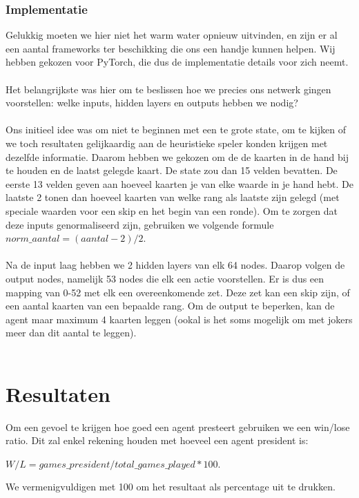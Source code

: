 \documentclass[11pt]{article}
\begin{document}
\subsubsection{Implementatie}
Gelukkig moeten we hier niet het warm water opnieuw uitvinden, en zijn er al een aantal frameworks ter beschikking die ons een handje kunnen helpen. Wij hebben gekozen voor PyTorch, die dus de implementatie details voor zich neemt.\\\\
Het belangrijkste was hier om te beslissen hoe we precies ons netwerk gingen voorstellen: welke inputs, hidden layers en outputs hebben we nodig?\\\\
Ons initieel idee was om niet te beginnen met een te grote state, om te kijken of we toch resultaten gelijkaardig aan de heuristieke speler konden krijgen met dezelfde informatie. Daarom hebben we gekozen om de de kaarten in de hand bij te houden en de laatst gelegde kaart. De state zou dan 15 velden bevatten. De eerste 13 velden geven aan hoeveel kaarten je van elke waarde in je hand hebt. De laatste 2 tonen dan hoeveel kaarten van welke rang als laatste zijn gelegd (met speciale waarden voor een skip en het begin van een ronde). Om te zorgen dat deze inputs genormaliseerd zijn, gebruiken we volgende formule $norm\_aantal = (aantal - 2)/2$.\\\\
Na de input laag hebben we 2 hidden layers van elk 64 nodes. Daarop volgen de output nodes, namelijk 53 nodes die elk een actie voorstellen. Er is dus een mapping van 0-52 met elk een overeenkomende zet. Deze zet kan een skip zijn, of een aantal kaarten van een bepaalde rang. Om de output te beperken, kan de agent maar maximum 4 kaarten leggen (ookal is het soms mogelijk om met jokers meer dan dit aantal te leggen).\\\\


\section{Resultaten}
Om een gevoel te krijgen hoe goed een agent presteert gebruiken we een win/lose ratio. Dit zal enkel rekening houden met hoeveel een agent president is:
\begin{center}
$W/L = games\_president/total\_games\_played * 100$.
\end{center}
We vermenigvuldigen met 100 om het resultaat als percentage uit te drukken.
\end{document}
